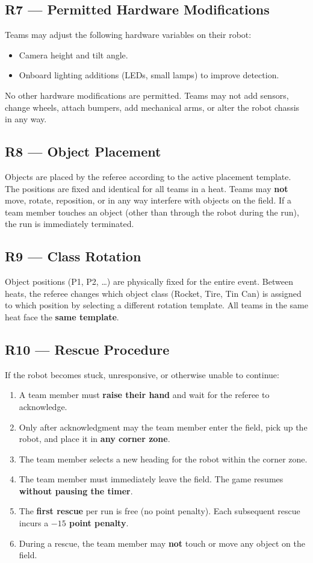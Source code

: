 \documentclass[a4]{article}
\begin{document}
\subsection*{R7 --- Permitted Hardware Modifications}
Teams may adjust the following hardware variables on their robot:
\begin{itemize}
    \item Camera height and tilt angle.
    \item Onboard lighting additions (LEDs, small lamps) to improve detection.
\end{itemize}
No other hardware modifications are permitted. Teams may not add sensors, change wheels, attach bumpers, add mechanical arms, or alter the robot chassis in any way.

\subsection*{R8 --- Object Placement}
Objects are placed by the referee according to the active placement template. The positions are fixed and identical for all teams in a heat. Teams may \textbf{not} move, rotate, reposition, or in any way interfere with objects on the field. If a team member touches an object (other than through the robot during the run), the run is immediately terminated.

\subsection*{R9 --- Class Rotation}
Object positions (P1, P2, \ldots) are physically fixed for the entire event. Between heats, the referee changes which object class (Rocket, Tire, Tin Can) is assigned to which position by selecting a different rotation template. All teams in the same heat face the \textbf{same template}.

\subsection*{R10 --- Rescue Procedure}
If the robot becomes stuck, unresponsive, or otherwise unable to continue:
\begin{enumerate}[label=\arabic*.]
    \item A team member must \textbf{raise their hand} and wait for the referee to acknowledge.
    \item Only after acknowledgment may the team member enter the field, pick up the robot, and place it in \textbf{any corner zone}.
    \item The team member selects a new heading for the robot within the corner zone.
    \item The team member must immediately leave the field. The game resumes \textbf{without pausing the timer}.
    \item The \textbf{first rescue} per run is free (no point penalty). Each subsequent rescue incurs a \textbf{$-15$ point penalty}.
    \item During a rescue, the team member may \textbf{not} touch or move any object on the field.
\end{enumerate}
\end{document}
